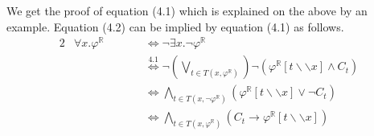 We get the proof of equation (4.1) which is explained on the above by an example. Equation (4.2) can be implied by equation (4.1) as follows.
\begin{alignat}{2}
	& \forall x. \varphi^\mathbb{R}\qquad   
	&&\stackrel{}{\Longleftrightarrow} \neg\exists x.\neg\varphi^\mathbb{R} \\
	& 
	&&\stackrel{4.1}{\Longleftrightarrow} \neg(\bigvee\limits_{t\in T(x,\varphi^\mathbb{R})}) \neg(\varphi^\mathbb{R} [t\backslash\backslash x] \wedge C_t) \\
	& 
	&&\stackrel{}{\Longleftrightarrow} \bigwedge\limits_{t\in T(x,\neg \varphi^\mathbb{R})} (\varphi^\mathbb{R} [t\backslash\backslash x] \vee\neg C_{t}) \\
	& 
	&&\stackrel{}{\Longleftrightarrow}  \bigwedge\limits_{t\in T(x, \varphi^\mathbb{R})} (C_{t} \rightarrow \varphi^\mathbb{R} [t\backslash\backslash x])
\end{alignat}
